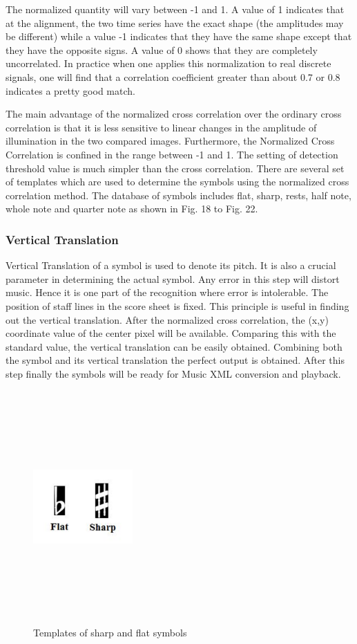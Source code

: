 \documentclass[journal]{IEEEtran}
\begin{document}
The normalized quantity will vary between -1 and 1. A value of 1 indicates that at the alignment, the two time series have the exact shape (the amplitudes may be different) while a value -1 indicates that they have the same shape except that they have the opposite signs. A value of 0 shows that they are completely uncorrelated. In practice when one applies this normalization to real discrete signals, one will find that a correlation coefficient greater than about 0.7 or 0.8 indicates a pretty good match. \par

The main advantage of the normalized cross correlation over the ordinary cross correlation is that it is less sensitive to linear changes in the amplitude of illumination in the two compared images. Furthermore, the Normalized Cross Correlation is confined in the range between -1 and 1. The setting of detection threshold value is much simpler than the cross correlation. There are several set of templates which are used to determine the symbols using the normalized
cross correlation method. The database of symbols includes flat, sharp, rests, half note, whole note and quarter note as shown in Fig. 18 to Fig. 22.

\subsubsection{Vertical Translation}
Vertical Translation of a symbol is used to denote its pitch. It is also a crucial parameter in determining the actual symbol. Any error in this step will distort music. Hence it is one part of the recognition where error is intolerable. The position of staff lines in the score sheet is fixed. This principle is useful in finding out the vertical translation. After the normalized cross correlation, the (x,y) coordinate value of the center pixel will be available. Comparing this with the standard value, the vertical translation can be easily obtained. Combining both the symbol and its vertical translation the perfect output is obtained. After this step finally the symbols will be ready for Music
XML conversion and playback.

\begin{figure}
\includegraphics[width=1.5in,height=3.5in,clip,keepaspectratio]{resources/implementation/template_flat_sharp}
\centering
\caption{Templates of sharp and flat symbols}
\end{figure}
\end{document}
